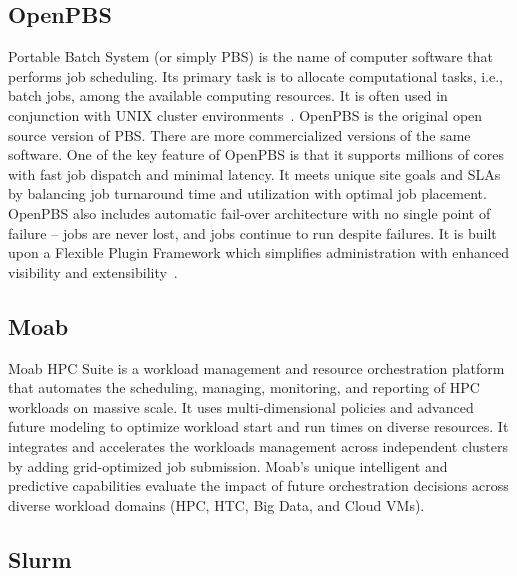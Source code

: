      \pv

\subsection{OpenPBS}

Portable Batch System (or simply PBS) is the name of computer software
that performs job scheduling. Its primary task is to allocate
computational tasks, i.e., batch jobs, among the available computing
resources. It is often used in conjunction with UNIX cluster
environments~\cite{openpbs-wiki}. OpenPBS is the original open source
version of PBS. There are more commercialized versions of the same
software. One of the key feature of OpenPBS is that it supports
millions of cores with fast job dispatch and minimal latency. It meets
unique site goals and SLAs by balancing job turnaround time and
utilization with optimal job placement. OpenPBS also includes
automatic fail-over architecture with no single point of failure –
jobs are never lost, and jobs continue to run despite failures. It is
built upon a Flexible Plugin Framework which simplifies administration
with enhanced visibility and extensibility~\cite{openpbs-www}.

\subsection{Moab}

     Moab HPC Suite is a workload management and resource orchestration
     platform that automates the scheduling, managing, monitoring, and
     reporting of HPC workloads on massive scale. It uses multi-dimensional
     policies and advanced future modeling to optimize workload start and
     run times on diverse resources. It integrates and accelerates the
     workloads management across independent clusters by adding
     grid-optimized job submission. Moab's unique intelligent and
     predictive capabilities evaluate the impact of future orchestration
     decisions across diverse workload domains (HPC, HTC, Big Data, and
     Cloud VMs)\cite{www-moab}.

\subsection{Slurm }

